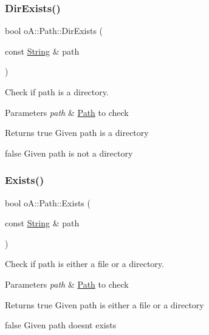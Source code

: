 \subsubsection{\texorpdfstring{Dir\+Exists()}{DirExists()}}
{\footnotesize\ttfamily bool o\+A\+::\+Path\+::\+Dir\+Exists (\begin{DoxyParamCaption}\item[{const \mbox{\hyperlink{classo_a_1_1_string}{String}} \&}]{path }\end{DoxyParamCaption})}



Check if path is a directory. 


\begin{DoxyParams}{Parameters}
{\em path} & \mbox{\hyperlink{namespaceo_a_1_1_path}{Path}} to check \\
\hline
\end{DoxyParams}
\begin{DoxyReturn}{Returns}
true Given path is a directory 

false Given path is not a directory 
\end{DoxyReturn}
\mbox{\label{namespaceo_a_1_1_path_a761a94ba9a50cc164837c4dc4b4c78ae}} 
\subsubsection{\texorpdfstring{Exists()}{Exists()}}
{\footnotesize\ttfamily bool o\+A\+::\+Path\+::\+Exists (\begin{DoxyParamCaption}\item[{const \mbox{\hyperlink{classo_a_1_1_string}{String}} \&}]{path }\end{DoxyParamCaption})}



Check if path is either a file or a directory. 


\begin{DoxyParams}{Parameters}
{\em path} & \mbox{\hyperlink{namespaceo_a_1_1_path}{Path}} to check \\
\hline
\end{DoxyParams}
\begin{DoxyReturn}{Returns}
true Given path is either a file or a directory 

false Given path doesn\textquotesingle{}t exists 
\end{DoxyReturn}
\mbox{\label{namespaceo_a_1_1_path_af332d947cbb51cf1141c0718169748c3}} 
